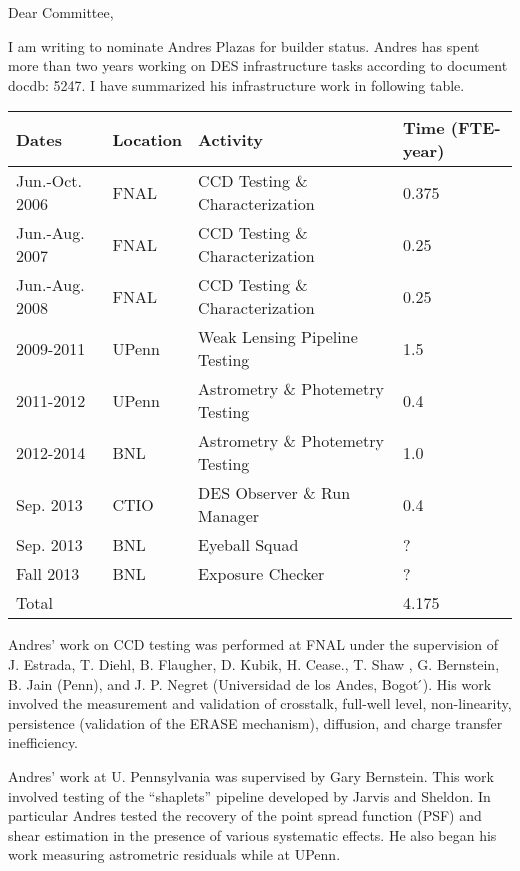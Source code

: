 \documentclass[12pt]{letter}
\begin{document}
\begin{letter}{}

\opening{Dear Committee,}

I am writing to nominate Andres Plazas for builder status.  Andres has spent
more than two years working on DES infrastructure tasks according to document
docdb: 5247. I have summarized his infrastructure work in following table.

\begin{tabular}{|l|l|l|l|}
    \hline
    Dates              & Location & Activity                         & Time (FTE-year) \\ \hline \hline
    Jun.-Oct. 2006     & FNAL     & CCD Testing \& Characterization  & 0.375 \\
    Jun.-Aug. 2007     & FNAL     & CCD Testing \& Characterization  & 0.25  \\
    Jun.-Aug. 2008     & FNAL     & CCD Testing \& Characterization  & 0.25  \\
    \hline
    2009-2011          & UPenn    & Weak Lensing Pipeline Testing    & 1.5 \\
    \hline
    2011-2012          & UPenn    & Astrometry \& Photemetry Testing & 0.4 \\
    2012-2014          & BNL      & Astrometry \& Photemetry Testing & 1.0 \\
    \hline
    Sep. 2013          & CTIO     & DES Observer \& Run Manager      & 0.4 \\
    \hline 
    Sep. 2013          & BNL      & Eyeball Squad                    & ? \\
    \hline 
    Fall 2013          & BNL      & Exposure Checker                 & ? \\
    \hline
    \hline
    Total              &          &                                  & 4.175 \\
    \hline
\end{tabular}

Andres' work on CCD testing was performed at FNAL under the supervision of J.
Estrada, T. Diehl, B. Flaugher, D. Kubik, H. Cease., T. Shaw , G.  Bernstein,
B. Jain (Penn), and J. P. Negret (Universidad de los Andes, Bogot ́).  His work
involved the measurement and validation of crosstalk, full-well level,
non-linearity, persistence (validation of the ERASE mechanism), diffusion, and
charge transfer inefficiency.

Andres' work at U. Pennsylvania was supervised by Gary Bernstein.  This work
involved testing of the ``shaplets'' pipeline developed by Jarvis and Sheldon.
In particular Andres tested the recovery of the point spread function (PSF) and
shear estimation in the presence of various systematic effects.  He also began
his work measuring astrometric residuals while at UPenn.


\end{letter}
\end{document}
